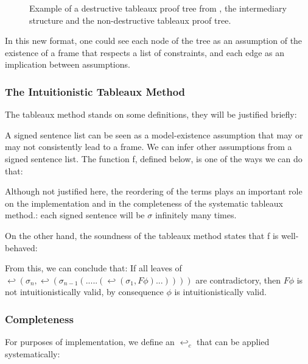 \documentclass[runningheads]{llncs}
\begin{document}
    \begin{figure}
\tableauxCumulativeAndNonCumulativeExampleFigure
\caption{Example of a destructive tableaux proof tree from \cite{book1}, the intermediary structure and the non-destructive tableaux proof tree.}
\label{fig:non_destructive_to_destructive_tableaux}
\end{figure}
    In this new format, one could see each node of the tree as an assumption of the existence of 
    a frame that respects a list of constraints, and each edge as an implication between assumptions.
\subsubsection{The Intuitionistic Tableaux Method }
The tableaux method stands on some definitions, they will be justified briefly:
\signedSentenceIntuitionisticDefinition
 

A signed sentence list can be seen as a model-existence assumption that may or may not consistently lead to a frame. We can infer other assumptions from a  signed sentence list. The function f, defined below, is one of the ways we can do that: 


\fIntuitionisticDefinition


Although not justified here, the reordering of the terms plays an important role on the implementation and in the completeness of the systematic tableaux method.: 
each signed sentence will be $\sigma$ infinitely many times.

On the other hand, 
the soundness of the tableaux method states that f is well-behaved:

\wellBehavedTheorem

\TableauxDevelopmentListDefinition

\TableauxDevelopmentExampleFigure

\soundnessTheorem



    From this, we can conclude that: 
        If all leaves of $ \hookleftarrow (\sigma_n,\hookleftarrow(\sigma_{n-1}(.....(\hookleftarrow(\sigma_1 , F\phi)...)))) $ are contradictory, then $F\phi$ is not intuitionistically valid, by consequence 
        $\phi$ is intuitionistically valid. 
        

\subsubsection{Completeness }

For purposes of implementation, we define an $\hookleftarrow_c$ that can be applied systematically: 
\end{document}
